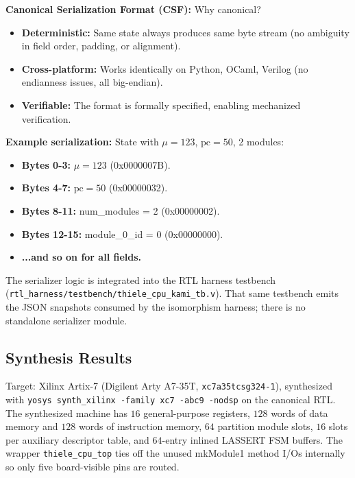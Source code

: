 \textbf{Canonical Serialization Format (CSF):} Why canonical?
\begin{itemize}
    \item \textbf{Deterministic:} Same state always produces same byte stream (no ambiguity in field order, padding, or alignment).
    \item \textbf{Cross-platform:} Works identically on Python, OCaml, Verilog (no endianness issues, all big-endian).
    \item \textbf{Verifiable:} The format is formally specified, enabling mechanized verification.
\end{itemize}

\textbf{Example serialization:} State with $\mu = 123$, $\text{pc} = 50$, 2 modules:
\begin{itemize}
    \item \textbf{Bytes 0-3:} $\mu = 123$ (0x0000007B).
    \item \textbf{Bytes 4-7:} $\text{pc} = 50$ (0x00000032).
    \item \textbf{Bytes 8-11:} num\_modules = 2 (0x00000002).
    \item \textbf{Bytes 12-15:} module\_0\_id = 0 (0x00000000).
    \item \textbf{...and so on for all fields.}
\end{itemize}


The serializer logic is integrated into the RTL harness testbench (\texttt{rtl\_harness/testbench/thiele\_cpu\_kami\_tb.v}). That same testbench emits the JSON snapshots consumed by the isomorphism harness; there is no standalone serializer module.

\subsection{Synthesis Results}

Target: Xilinx Artix-7 (Digilent Arty A7-35T, \texttt{xc7a35tcsg324-1}),
synthesized with \texttt{yosys synth\_xilinx -family xc7 -abc9 -nodsp}
on the canonical RTL. The synthesized machine has $16$ general-purpose
registers, $128$ words of data memory and $128$ words of instruction
memory, $64$ partition module slots, $16$ slots per auxiliary descriptor
table, and $64$-entry inlined LASSERT FSM buffers. The wrapper
\texttt{thiele\_cpu\_top} ties off the unused mkModule1 method I/Os
internally so only five board-visible pins are routed.

